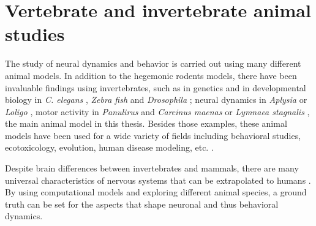 \section{Vertebrate and invertebrate animal studies}
\label{c-intro-invertebrates}
The study of neural dynamics and behavior is carried out using many different animal models. In addition to the hegemonic rodents models, there have been invaluable findings using invertebrates, such as in genetics and in developmental biology in \textit{C. elegans} \parencite{brenner_genetics_1974}, \textit{Zebra fish} \parencite{streisinger_production_1981} and \textit{Drosophila} \parencite{nusslein-volhard_mutations_1980}; neural dynamics in \textit{Aplysia} \parencite{wachtel_direct_1967} or \textit{Loligo} \parencite{hodgkin_quantitative_1952}, motor activity in \textit{Panulirus} \parencite{selverston_stomatogastric_1976} and \textit{Carcinus maenas} \parencite{eisen_mechanisms_1982} or \textit{Lymnaea stagnalis} \parencite{benjamin_central_1979}, the main animal model in this thesis. Besides those examples, these animal models have been used for a wide variety of fields including behavioral studies, ecotoxicology, evolution, human disease modeling, etc. \parencite{romanova_animal_2018}.

Despite brain differences between invertebrates and mammals, there are many universal characteristics of nervous systems that can be extrapolated to humans \parencite{preuss_taking_2000}. By using computational models and exploring different animal species, a ground truth can be set for the aspects that shape neuronal and thus  behavioral dynamics. 



